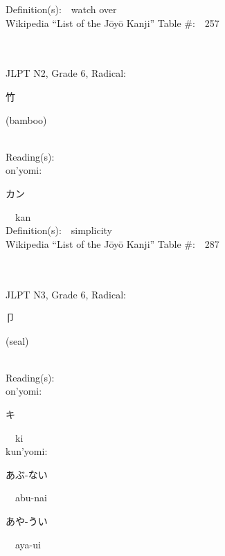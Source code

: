 \begin{multicols}{2}
Definition(s):\ \ watch over \\
Wikipedia ``List of the J\=oy\=o Kanji'' Table \#:\ \ 257 \\
\ \ \\
{\fontsize{34pt}{40pt}  }\ \ \\  %
{JLPT N2, Grade 6, Radical:\ \ {\begin{CJK}{UTF8}{min} 竹 \end{CJK}} (bamboo) } \\
Reading(s):\ \ \\
{\hspace*{1em}}on'yomi:\ \ \\
{\hspace*{2em}}{\begin{CJK}{UTF8}{min} カン \end{CJK}}\ \ kan\ \ \\
Definition(s):\ \ simplicity \\
Wikipedia ``List of the J\=oy\=o Kanji'' Table \#:\ \ 287 \\
\ \ \\
{\fontsize{34pt}{40pt}  }\ \ \\  %
{JLPT N3, Grade 6, Radical:\ \ {\begin{CJK}{UTF8}{min} 卩 \end{CJK}} (seal) } \\
Reading(s):\ \ \\
{\hspace*{1em}}on'yomi:\ \ \\
{\hspace*{2em}}{\begin{CJK}{UTF8}{min} キ \end{CJK}}\ \ ki\ \ \\
{\hspace*{1em}}kun'yomi:\ \ \\
{\hspace*{2em}}{\begin{CJK}{UTF8}{min} あぶ-ない \end{CJK}}\ \ abu-nai\ \ \\
{\hspace*{2em}}{\begin{CJK}{UTF8}{min} あや-うい \end{CJK}}\ \ aya-ui\ \ \\

\end{multicols}
